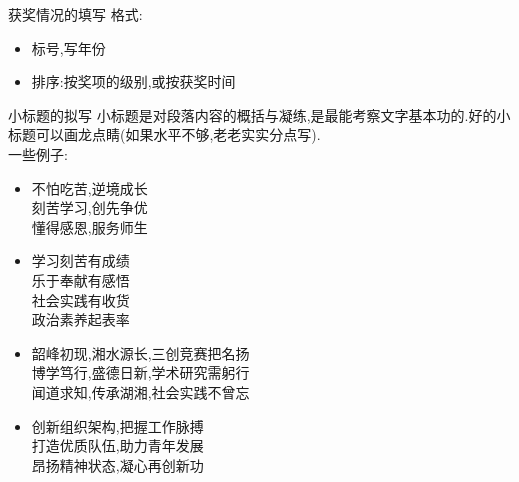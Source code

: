 \documentclass{beamer}
\begin{document}
\begin{frame}{获奖情况的填写}
格式:
  \begin{itemize}
  	\item 
  	标号,写年份
  	\item
  	排序:按奖项的级别,或按获奖时间
  \end{itemize}
\end{frame}

\begin{frame}{小标题的拟写}
小标题是对段落内容的概括与凝练,是最能考察文字基本功的.好的小标题可以画龙点睛(如果水平不够,老老实实分点写).\\

一些例子:
\begin{itemize}
	\item
	不怕吃苦,逆境成长\\
	刻苦学习,创先争优\\
	懂得感恩,服务师生
	\item
	学习刻苦有成绩\\
	乐于奉献有感悟\\
	社会实践有收货\\
	政治素养起表率
	\item
	韶峰初现,湘水源长,三创竞赛把名扬\\
	博学笃行,盛德日新,学术研究需躬行\\
	闻道求知,传承湖湘,社会实践不曾忘
	\item
	创新组织架构,把握工作脉搏\\
	打造优质队伍,助力青年发展\\
	昂扬精神状态,凝心再创新功	
\end{itemize}

\end{frame}
\end{document}
